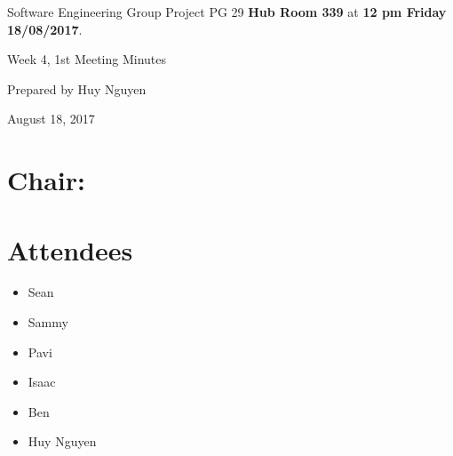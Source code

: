 \documentclass[11pt, a4paper]{article}
\begin{document}
	\noindent Software Engineering Group Project PG 29 {\bf Hub Room 339} at {\bf 12 pm Friday 18/08/2017}.
	\vspace*{10pt}
	\begin{center}
		\huge Week 4, 1st Meeting Minutes
	\end{center}
	\vspace*{10pt}
	\begin{center}
		\huge Prepared by Huy Nguyen
	\end{center}
	\begin{center}
		\huge August 18, 2017
	\end{center}
	\section*{Chair:}
	
	\section{Attendees}
	\begin{itemize}
		\item Sean
		\item Sammy
		\item Pavi
		\item Isaac
		\item Ben
		\item Huy Nguyen
	\end{itemize}
	
	
	
\end{document}
